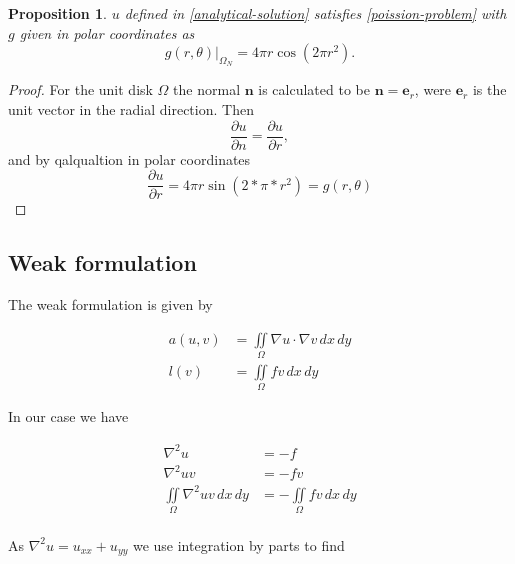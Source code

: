 \documentclass[5p,a4paper,english]{elsarticle}%
\newcommand\restr[2]{\ensuremath{\left.#1\right|_{#2}}}
\newtheorem{proposition}[theorem]{Proposition}
\begin{document}
\begin{proposition}  
$u$ defined in \eqref{analytical-solution} satisfies \eqref{poission-problem} with $g$ given in polar coordinates as
\begin{equation*}
    \restr{g(r,\theta)}{\Omega_N} =   4\pi r\cos(2\pi r^2).
\end{equation*}
\end{proposition}
\begin{proof}
    For the unit disk $\Omega$ the normal $\boldsymbol n$ is calculated to be $\boldsymbol{n} = \boldsymbol{e}_r$, were $ \boldsymbol{e}_r$ is the unit vector in the radial direction. Then 
    \begin{equation*}
        \frac{\partial u}{\partial n} = \frac{\partial u}{\partial r},
    \end{equation*}
    and by qalqualtion in polar coordinates
    \begin{equation*}
        \frac{\partial u}{\partial r} = 4 \pi r \sin(2*\pi*r^2) = g(r,\theta)
    \end{equation*}

\end{proof}

\subsection{Weak formulation}


The weak formulation is given by 


\begin{equation*}
\begin{aligned}
    a(u,v) &= \iint\limits_{\Omega} \nabla u \cdot \nabla v \, dx \, dy
    \\
    l(v) &= \iint\limits_{\Omega} fv \, dx \, dy
\end{aligned}
\end{equation*}

In our case we have

\begin{equation*}
\begin{aligned}
    \nabla^2u &=  -f
    \\
    \nabla^2uv &= -fv
    \\
     \iint\limits_{\Omega} \nabla^2uv \, dx \, dy &=  -\iint\limits_{\Omega} fv \, dx \, dy
    \\
    \end{aligned}
\end{equation*}

As $\nabla^2u = u_{xx} + u_{yy}$ we use integration by parts to find
\end{document}
